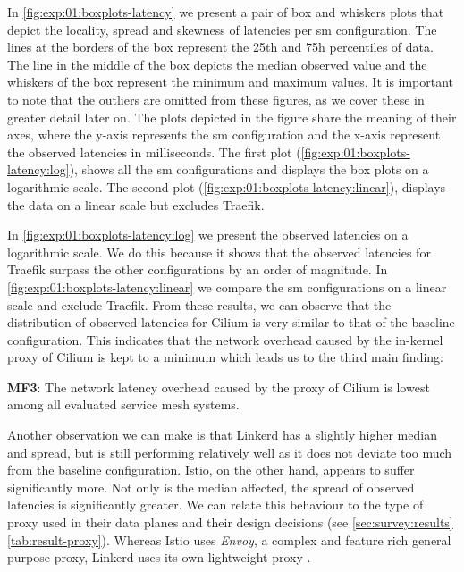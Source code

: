 In \cref{fig:exp:01:boxplots-latency} we present a pair of box and whiskers plots that depict the locality, spread and skewness of latencies per \gls{sm} configuration. The lines at the borders of the box represent the 25th and 75h percentiles of data. The line in the middle of the box depicts the median observed value and the whiskers of the box represent the minimum and maximum values. It is important to note that the outliers are omitted from these figures, as we cover these in greater detail later on. The plots depicted in the figure share the meaning of their axes, where the y-axis represents the \gls{sm} configuration and the x-axis represent the observed latencies in milliseconds. The first plot (\cref{fig:exp:01:boxplots-latency:log}), shows all the \gls{sm} configurations and displays the box plots on a logarithmic scale. The second plot (\cref{fig:exp:01:boxplots-latency:linear}), displays the data on a linear scale but excludes Traefik.

In \cref{fig:exp:01:boxplots-latency:log} we present the observed latencies on a logarithmic scale. We do this because it shows that the observed latencies for Traefik surpass the other configurations by an order of magnitude. In \cref{fig:exp:01:boxplots-latency:linear} we compare the \gls{sm} configurations on a linear scale and exclude Traefik. From these results, we can observe that the distribution of observed latencies for Cilium is very similar to that of the baseline configuration. This indicates that the network overhead caused by the in-kernel proxy of Cilium is kept to a minimum which leads us to the third main finding:

\begin{shaded*}
    \noindent
    \textbf{MF3}: 
    The network latency overhead caused by the proxy of Cilium is lowest among all evaluated service mesh systems.
\end{shaded*}

Another observation we can make is that Linkerd has a slightly higher median and spread, but is still performing relatively well as it does not deviate too much from the baseline configuration. Istio, on the other hand, appears to suffer significantly more. Not only is the median affected, the spread of observed latencies is significantly greater. We can relate this behaviour to the type of proxy used in their data planes and their design decisions (see \cref{sec:survey:results} \cref{tab:result-proxy}). Whereas Istio uses \textit{Envoy}, a complex and feature rich general purpose proxy, Linkerd uses its own lightweight proxy \cite{linkerd-no-envoy}.


